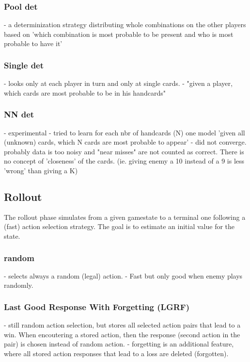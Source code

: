 \subsubsection{Pool det}
- a determinization strategy distributing whole combinations on the other players based on 'which combination is most probable to be present and who is most probable to have it'


\subsubsection{Single det}
- looks only at each player in turn and only at single cards.
- "given a player, which cards are most probable to be in his handcards"

\subsubsection{NN det}
- experimental
- tried to learn for each nbr of handcards (N) one model 'given all (unknown) cards, which N cards are most probable to appear'
- did not converge. probably data is too noisy and "near misses" are not counted as correct. There is no concept of 'closeness' of the cards. (ie. giving enemy a 10 instead of a 9 is less 'wrong' than giving a K)



\subsection{Rollout}
\label{sec:rollout}
The rollout phase simulates from a given gamestate to a terminal one following a (fast) action selection strategy. The goal is to estimate an initial value for the state.

\subsubsection{random}
- selects always a random (legal) action.
- Fast but only good when enemy plays randomly.

\subsubsection{Last Good Response With Forgetting (LGRF)}
- still random action selection, but stores all selected action pairs that lead to a win. When encoutering a stored action, then the response (second action in the pair) is chosen instead of random action.
- forgetting is an additional feature, where all stored action responses that lead to a loss are deleted (forgotten).

